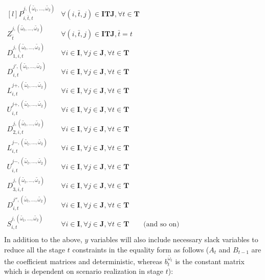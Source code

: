 \documentclass[11pt,letter]{article}
\begin{document}
$
\begin{matrix*}[l]
P_{i,\bar{t},t}^{j,(\tilde{\omega_t},\ldots ,\tilde{\omega_2})} & \forall (i,\bar{t},j)\in \textbf{ITJ}, \forall t \in \textbf{T}\\
Z_{\bar{t}}^{j,(\tilde{\omega_t},\ldots ,\tilde{\omega_2})} &  \forall (i,\bar{t},j)\in \textbf{ITJ}, \bar{t}=t\\
D_{1,i,t}^{j,(\tilde{\omega_t},\ldots ,\tilde{\omega_2})} &  \forall i \in \textbf{I}, \forall j \in \textbf{J}, \forall t \in \textbf{T}\\
D_{i,t}^{j{'},(\tilde{\omega_t},\ldots ,\tilde{\omega_2})}  & \forall i \in \textbf{I}, \forall j \in \textbf{J}, \forall t \in \textbf{T} \\
L_{i,t}^{j{+},(\tilde{\omega_t},\ldots ,\tilde{\omega_2})}  & \forall i \in \textbf{I}, \forall j \in \textbf{J}, \forall t \in \textbf{T} \\
U_{i,t}^{j{+},(\tilde{\omega_t},\ldots ,\tilde{\omega_2})} & \forall i \in \textbf{I}, \forall j \in \textbf{J}, \forall t \in \textbf{T} \\
D_{2,i,t}^{j,(\tilde{\omega_t},\ldots ,\tilde{\omega_2})} & \forall i \in \textbf{I}, \forall j \in \textbf{J}, \forall t \in \textbf{T} \\
L_{i,t}^{j{-},(\tilde{\omega_t},\ldots ,\tilde{\omega_2})} & \forall i \in \textbf{I}, \forall j \in \textbf{J}, \forall t \in \textbf{T} \\ 
U_{i,t}^{j{-},(\tilde{\omega_t},\ldots ,\tilde{\omega_2})} & \forall i \in \textbf{I}, \forall j \in \textbf{J}, \forall t \in \textbf{T} \\
D_{3,i,t}^{j,(\tilde{\omega_t},\ldots ,\tilde{\omega_2})} & \forall i \in \textbf{I}, \forall j \in \textbf{J}, \forall t \in \textbf{T} \\
D_{i,t}^{j{''},(\tilde{\omega_t},\ldots ,\tilde{\omega_2})} & \forall i \in \textbf{I}, \forall j \in \textbf{J}, \forall t \in \textbf{T} \\ 
S_{i,t}^{j,(\tilde{\omega_t},\ldots ,\tilde{\omega_2})} & \forall i \in \textbf{I}, \forall j \in \textbf{J}, \forall t \in \textbf{T} \qquad \text{(and so on)}\\
\end{matrix*}
$ \\
In addition to the above, $y$ variables will also include necessary slack variables to reduce all the stage $t$ constraints in the equality form as follows ($A_{t}$ and $B_{t-1}$ are the coefficient matrices and deterministic, whereas $b_t^{\tilde{\omega_t}}$ is the constant matrix which is dependent on scenario realization in stage $t$): \\
\end{document}
